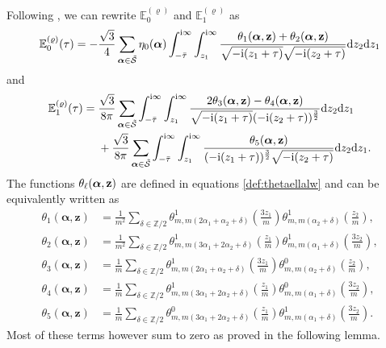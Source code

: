 \documentclass[pdftex]{sigma}
\def\BE{\mathbb{E}}
\def\CS{\mathcal{S}}
\newcommand{\ZZ}{\mathbb{Z}}
\def\bos{\varrho}
\def\al{\alpha}
\def\bal{\boldsymbol{\alpha}}
\theoremstyle{definition}
\numberwithin{equation}{section}
\begin{document}
Following \cite{bringmann2018higher}, we can rewrite $\mathbb{E}^{(\bos)}_{0}$ and $\mathbb{E}^{(\bos)}_{1}$ as
\[%
	\BE_0^{(\bos)}(\tau) =
 -\frac{\sqrt{3}}{4} \sum_{\boldsymbol{\alpha} \in \tilde{\CS}}
	\eta_0(\boldsymbol{\alpha})
	\int_{-\bar{\tau}}^{{\rm i} \infty}\int_{z_1}^{{\rm i} \infty}
	\frac{\theta_1({\boldsymbol\alpha},
	{\bf z})+\theta_2({\boldsymbol\alpha},
	{\bf z})}{\sqrt{-{\rm i}(z_1+\tau)}\sqrt{-{\rm i}(z_2+\tau)}}{\rm d}z_2{\rm d}z_1
\]
and
\begin{align*}%
\BE_1^{(\bos)}(\tau) ={}&\frac{\sqrt{3}}{8 \pi}
\sum_{\boldsymbol{\alpha} \in \tilde{\CS}}
\int_{-\bar{\tau}}^{{\rm i} \infty}
\int_{z_1}^{{\rm i} \infty}\frac{2\theta_3({\bal}, {\bf z})-
\theta_4({\bal},
{\bf z})}{\sqrt{-{\rm i}(z_1+\tau)}(-{\rm i}(z_2+\tau))^{\frac{3}{2}}}
{\rm d}z_2{\rm d}z_1 \\
 &+\frac{\sqrt{3}}{8 \pi}\sum_{\boldsymbol{\alpha} \in \tilde{\CS}}
\int_{-\bar{\tau}}^{{\rm i} \infty}
\int_{z_1}^{{\rm i} \infty}\frac{\theta_5({\bal},
{\bf z})}{(-{\rm i}(z_1+\tau))^{\frac{3}{2}}\sqrt{-{\rm i}(z_2+\tau)}} {\rm d}z_2{\rm d}z_1 .
\end{align*}
The functions $\theta_\ell({\bal}, {\bf z})$ are defined in equations \eqref{def:thetaellalw} and can be equivalently written as
\begin{align*}%
\theta_1(\bal,\mathbf{z}) &=
\frac{1}{m^2} \sum_{\delta\in\ZZ/2}
\theta^1_{m,m(2\al_1+\al_2+\delta)}\left(\frac{3z_1}{m}\right)
\theta^1_{m,m(\al_2+\delta)}\left(\frac{z_2}{m}\right),
\\
\theta_2(\bal,\mathbf{z}) &=
\frac{1}{m^2} \sum_{\delta\in\ZZ/2}
\theta^1_{m,m(3\al_1+2\al_2+\delta)}\left(\frac{z_1}{m}\right)
\theta^1_{m,m(\al_1+\delta)}\left(\frac{3z_2}{m}\right),
\\
\theta_3 (\bal,\mathbf{z}) &=
\frac{1}{m} \sum_{\delta\in\ZZ/2}
\theta^1_{m,m(2\al_1+\al_2+\delta)}\left(\frac{3z_1}{m}\right)
\theta^0_{m,m(\al_2+\delta)}\left(\frac{z_2}{m}\right),
\\
\theta_4 (\bal,\mathbf{z}) &=
\frac{1}{m} \sum_{\delta\in\ZZ/2}
\theta^1_{m,m(3\al_1+2\al_2+\delta)}\left(\frac{z_1}{m}\right)
\theta^0_{m,m(\al_1+\delta)}\left(\frac{3z_2}{m}\right),
\\
\theta_5 (\bal,\mathbf{z}) &=
\frac{1}{m} \sum_{\delta\in\ZZ/2}
\theta^0_{m,m(3\al_1+2\al_2+\delta)}\left(\frac{z_1}{m}\right)
\theta^1_{m,m(\al_1+\delta)}\left(\frac{3z_2}{m}\right).
\end{align*}
Most of these terms however sum to zero as proved in the following lemma.
\end{document}
